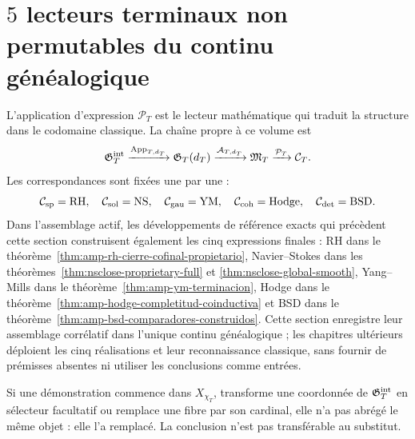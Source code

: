 \section{\(5\) lecteurs terminaux non permutables du continu généalogique}

L’application d’expression $\mathcal P_T$ est le lecteur mathématique qui traduit la structure dans le codomaine classique. La chaîne propre à ce volume est
\begin{equation}\label{eq:pdf2-cinco-cadenas}
 \mathfrak G_T^{\rm int}\xrightarrow{\operatorname{App}_{T,d_T}}
 \mathfrak G_T(d_T)\xrightarrow{\mathcal A_{T,d_T}}\mathfrak M_T
 \xrightarrow{\mathcal P_T}\mathcal C_T.
\end{equation}
Les correspondances sont fixées une par une :
\[
 \mathcal C_{\rm sp}=\mathrm{RH},\quad
 \mathcal C_{\rm sol}=\mathrm{NS},\quad
 \mathcal C_{\rm gau}=\mathrm{YM},\quad
 \mathcal C_{\rm coh}=\mathrm{Hodge},\quad
 \mathcal C_{\rm det}=\mathrm{BSD}.
\]
Dans l’assemblage actif, les développements de référence exacts qui précèdent cette section construisent également les cinq expressions finales : RH dans le théorème~\ref{thm:amp-rh-cierre-cofinal-propietario}, Navier--Stokes dans les théorèmes~\ref{thm:nsclose-proprietary-full} et \ref{thm:nsclose-global-smooth}, Yang--Mills dans le théorème~\ref{thm:amp-ym-terminacion}, Hodge dans le théorème~\ref{thm:amp-hodge-completitud-coinductiva} et BSD dans le théorème~\ref{thm:amp-bsd-comparadores-construidos}. Cette section enregistre leur assemblage corrélatif dans l’unique continu généalogique ; les chapitres ultérieurs déploient les cinq réalisations et leur reconnaissance classique, sans fournir de prémisses absentes ni utiliser les conclusions comme entrées.

\begin{falsifier}
Si une démonstration commence dans $X_{\chi_T}$, transforme une coordonnée de $\mathfrak G_T^{\rm int}$ en sélecteur facultatif ou remplace une fibre par son cardinal, elle n’a pas abrégé le même objet : elle l’a remplacé. La conclusion n’est pas transférable au substitut.
\end{falsifier}
